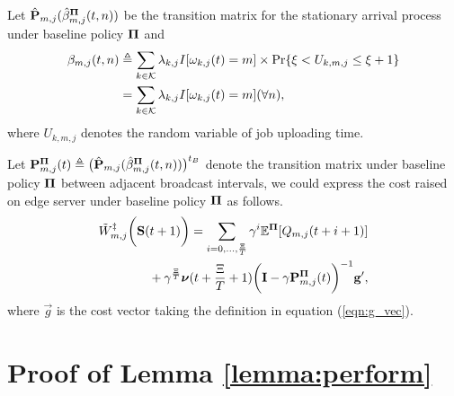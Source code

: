 Let $\hat{\mathbf{P}}_{m,j}(\hat{\beta}^{\boldsymbol{\Pi}}_{m,j}(t,n))$ be the transition matrix for the stationary arrival process under baseline policy $\boldsymbol{\Pi}$ and
{\small
\begin{align}
    \beta_{m,j}(t,n) &\triangleq \sum_{k\in\mathcal{K}} \lambda_{k,j}I[\omega_{k,j}(t)=m] \times \Pr\{ \xi<U_{k,m,j}\le\xi+1 \}
    \nonumber\\
    &= \sum_{k\in\mathcal{K}} \lambda_{k,j}I[\omega_{k,j}(t)=m] (\forall n),
\end{align}
}
where $U_{k,m,j}$ denotes the random variable of job uploading time.

Let
$\mathbf{P}^{\boldsymbol{\Pi}}_{m,j}(t) \triangleq \big( \hat{\mathbf{P}}_{m,j}(\hat{\beta}^{\boldsymbol{\Pi}}_{m,j}(t,n)) \big)^{t_B}$
denote the transition matrix under baseline policy $\boldsymbol{\Pi}$ between adjacent broadcast intervals, we could express the cost raised on edge server under baseline policy $\boldsymbol{\Pi}$ as follows.
{\small
\begin{align}
    &\tilde{W}^{\ddagger}_{m,j}\bigg(\mathbf{S}(t+1)\bigg)
    = \sum_{i=0,\dots,\frac{\Xi}{T}} \gamma^{i} \mathbb{E}^{\boldsymbol{\Pi}}[ Q_{m,j}({t+i+1}) ]
    \nonumber\\
    &~~~~~~~~~~~~+ \gamma^{\frac{\Xi}{T}} 
    \boldsymbol{\nu}({t+\frac{\Xi}{T}+1})
    \bigg(
        \mathbf{I} - \gamma \mathbf{P}^{\boldsymbol{\Pi}}_{m,j}(t)
    \bigg)^{-1} \mathbf{g}',
\end{align}   
}
where $\vec{g}$ is the cost vector taking the definition in equation (\ref{eqn:g_vec}).

\section{ Proof of Lemma \ref{lemma:perform} }
\label{append_3}


